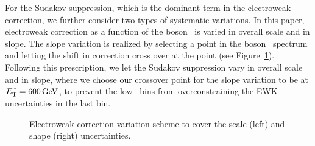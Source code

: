 For the Sudakov suppression, which is the dominant term in the electroweak correction, we further consider two types of systematic variations.
In this paper, electroweak correction as a function of the boson \pt\ is varied in overall scale and in slope. 
The slope variation is realized by selecting a point in the boson \pt\ spectrum and letting the shift in correction cross over at the point (see Figure~\ref{fig:ewk_correction_cartoon}). 
Following this prescription, we let the Sudakov suppression vary in overall scale and in slope, where we choose our crossover point for the slope variation to be at $E_{\mathrm{T}}^{\gamma}=600\,\text{Ge\hspace{-.08em}V}$, to prevent the low \ETg\ bins from overconstraining the EWK uncertainties in the last bin.  
\begin{figure}[htbp]
  \centering
  \caption{
    Electroweak correction variation scheme to cover the scale (left) and shape (right) uncertainties.
  }
  \label{fig:ewk_correction_cartoon}
\end{figure}

